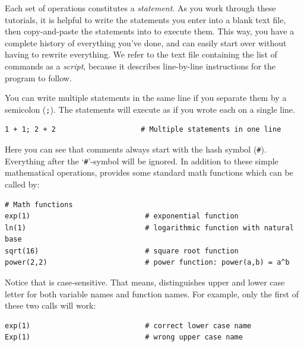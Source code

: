 Each set of operations constitutes a \emph{statement}.
As you work through these tutorials, it is helpful to write the statements you enter into a blank text file, then copy-and-paste the statements into \Rev to execute them.
This way, you have a complete history of everything you've done, and can easily start over without having to rewrite everything.
We refer to the text file containing the list of commands as a \emph{script}, because it describes line-by-line instructions for the program to follow.

You can write multiple statements in the same line if you separate them by a semicolon (\texttt{;}).
The statements will execute as if you wrote each on a single line.
{\tt \begin{snugshade*}
\begin{lstlisting}    
1 + 1; 2 + 2                    # Multiple statements in one line
\end{lstlisting}
\end{snugshade*}}

Here you can see that comments always start with the hash symbol (\texttt{\#}).
Everything after the `\texttt{\#}'-symbol will be ignored.
In addition to these simple mathematical operations, \Rev provides some standard math functions which can be called by:
{\tt \begin{snugshade*}
\begin{lstlisting}    
# Math functions
exp(1)                           # exponential function
ln(1)                            # logarithmic function with natural base
sqrt(16)                         # square root function 
power(2,2)                       # power function: power(a,b) = a^b
\end{lstlisting}
\end{snugshade*}}
Notice that \Rev is case-sensitive.
That means, \Rev distinguishes upper and lower case letter for both variable names and function names.
For example, only the first of these two calls will work:
{\tt \begin{snugshade*}
\begin{lstlisting}    
exp(1)                           # correct lower case name
Exp(1)                           # wrong upper case name
\end{lstlisting}
\end{snugshade*}}

